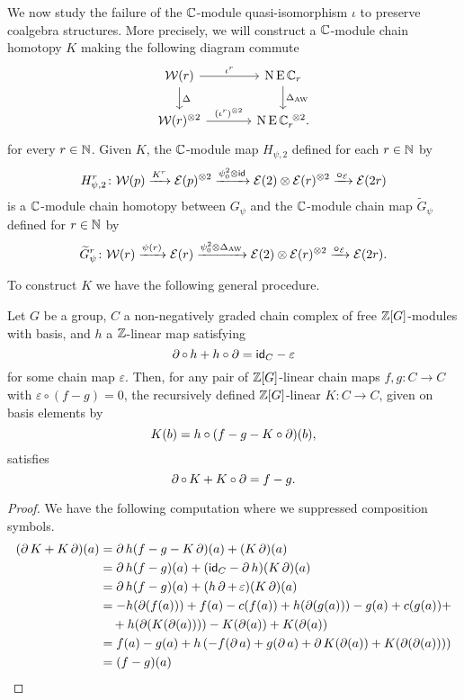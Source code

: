 We now study the failure of the $\mathbb{C}$-module quasi-isomorphism $\iota$ to preserve coalgebra structures.
More precisely, we will construct a $\mathbb{C}$-module chain homotopy $K$ making the following diagram commute
\[
\begin{tikzcd}[column sep=large]
	\cW(r) \arrow[r,"\iota^r"] \arrow[d,"\Delta"] & \chains\EE\cyc_r \arrow[d,"\Delta_{\AW}"]\\
	\cW(r)^{\ot 2} \arrow[r,"(\iota^r)^{\ot 2}"] & \chains\EE\cyc_r^{\ \ot 2}.
\end{tikzcd}
\]
for every $r \in \mathbb{N}$.
Given $K$, the $\mathbb{C}$-module map $H_{\psi,2}$ defined for each $r \in \mathbb{N}$ by
\[
H_{\psi,2}^r \colon \mathcal{W}(p) \xrightarrow{K^r} \mathcal{E}(p)^{\otimes 2} \xrightarrow{\psi^2_0 \otimes \mathsf{id}} \mathcal{E}(2) \otimes \mathcal{E}(r)^{\otimes 2} \xrightarrow{\bm{\circ}_{\mathcal{E}}} \mathcal{E}(2r)
\]
is a $\mathbb{C}$-module chain homotopy between $G_\psi$ and the $\mathbb{C}$-module chain map $\widetilde G_\psi$ defined for $r \in \mathbb{N}$ by
\[
\widetilde G_\psi^r \colon \mathcal{W}(r) \xrightarrow{\psi(r)} \mathcal{E}(r) \xrightarrow{\psi^2_0 \otimes \Delta_{\operatorname{AW}}} \mathcal{E}(2) \otimes \mathcal{E}(r)^{\otimes 2} \xrightarrow{\bm{\circ}_{\mathcal{E}}} \mathcal{E}(2r).
\]

To construct $K$ we have the following general procedure.

\begin{lemma}
	Let $G$ be a group, $C$ a non-negatively graded chain complex of free $\mathbb{Z}[G]$-modules with basis, and $h$ a $\mathbb{Z}$-linear map satisfying
	\[
	\operatorname{\partial} \circ \, h + h \circ \operatorname{\partial} = \mathsf{id}_C - \varepsilon
	\]
	for some chain map $\varepsilon$.
	Then, for any pair of $\mathbb{Z}[G]$-linear chain maps $f,g \colon C \to C$ with $\varepsilon \circ (f-g) = 0$, the recursively defined $\mathbb{Z}[G]$-linear $K \colon C \to C$, given on basis elements by
	\[
	K(b) = h \circ (f - g - K \circ \operatorname{\partial})(b),
	\]
	satisfies
	\[
	\operatorname{\partial} \circ \, K + K \circ \operatorname{\partial} = f - g.
	\]
\end{lemma}

\begin{proof}
	We have the following computation where we suppressed composition symbols.
	\begin{align*}
		(\bd K + K \bd)(a)
		&= \bd h(f - g - K \bd)(a) + (K \bd)(a) \\
		&= \bd h(f-g)(a) + (\id_C - \bd h)(K \bd)(a) \\
		&= \bd h(f-g)(a) + (h \bd +\, \varepsilon)(K \bd)(a) \\
%
		&= -h(\bd(f(a))) + f(a) -c(f(a))+ h(\bd(g(a))) - g(a)+c(g(a))  + \\
		&\quad + h(\bd(K(\bd(a)))) - K(\bd(a)) + K(\bd(a)) \\
		&= f(a) - g(a) + h\left(-f(\bd a) + g(\bd a) + \bd K(\bd(a)) + K(\bd(\bd(a)))\right) \\
		&= (f - g)(a)
	\end{align*}
\end{proof}

